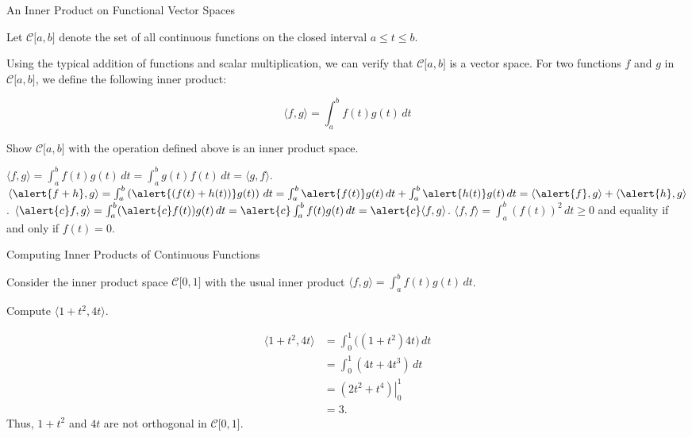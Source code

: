 \documentclass[xcolor=dvipsnames,aspectratio=169,t]{beamer}
\begin{document}
\begin{frame}{An Inner Product on Functional Vector Spaces}
  \smallskip

  Let $\mathcal{C}\lbrack a , b \rbrack$ denote the set of all \alert{continuous functions} on the closed interval $a \leq t \leq b$.

  \bi
  \ii Using the typical addition of functions and scalar multiplication, we can verify that $\mathcal{C}\lbrack a , b \rbrack$ is a vector space.
  \ii For two functions $f$ and $g$ in $\mathcal{C}\lbrack a , b \rbrack$, we define the following inner product:
  \vspace*{-1em}
  
  \[ \langle f , g \rangle = \int_a^b f(t)g(t) \, dt\]
  \ei

  Show $\mathcal{C}\lbrack a , b \rbrack$ with the operation defined above is an \alert{inner product space}.
  \medskip

  \pause
  \bb
  \ii $\langle f , g \rangle = \int_a^b f(t)g(t) \, dt = \int_a^b g(t)f(t) \, dt = \langle g , f \rangle$. \smallskip
  \ii $\langle \alert{f + h}  , g \rangle =  \int_a^b \left( \alert{(f(t)+ h(t))}  g(t) \right) \, dt  =   \int_a^b  \alert{f(t)}g(t) \, dt +   \int_a^b \alert{h(t)}g(t) \, dt  = \langle \alert{f} , g \rangle + \langle \alert{h} , g \rangle$.\smallskip%
  \ii $\langle \alert{c}f , g \rangle = \int_a^b (\alert{c}f(t))g(t) \, dt = \alert{c} \int_a^b f(t)g(t) \, dt = \alert{c} \langle f, g \rangle$. \smallskip
  \ii $\langle f , f \rangle =  \int_a^b (f(t))^2 \, dt \geq 0$ and equality if and only if $f(t) = 0$.
  \ee
\end{frame}


\begin{frame}{Computing Inner Products of Continuous Functions}
  \smallskip
  
  Consider the inner product space $\mathcal{C}\lbrack 0 , 1 \rbrack$ with the usual inner product $\langle f , g \rangle = \int_a^b f(t)g(t) \, dt$.
  \smallskip
  
  Compute $\langle 1+t^2, 4t \rangle$.

  \pause
  \begin{align*}
    \langle 1+t^2, 4t \rangle &= \int_0^1 \bigg( (1+t^2)4t \bigg)  \, dt \\
    &=  \int_0^1 (4t+4t^3)  \, dt \\
    &= \left. (2t^2 + t^4) \right|_0^1 \\
    &= 3.
  \end{align*}
  Thus, $1+t^2$ and $4t$ are \alert{not orthogonal} in $\mathcal{C}\lbrack 0 , 1 \rbrack$.
\end{frame}
\end{document}

